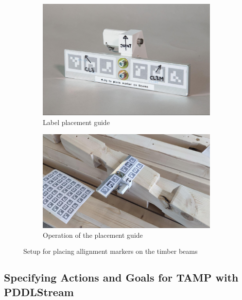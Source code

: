 \begin{figure}[!h]
    \centering
    \begin{subfigure}[b]{0.45\textwidth}
        \centering
        \includegraphics[width=\textwidth]{images/08/img20.jpg}
        \caption{Label placement guide}
        \label{fig:label-placement-guide}
    \end{subfigure}
    \hfill
    \begin{subfigure}[b]{0.53\textwidth}
        \centering
        \includegraphics[width=\textwidth]{images/08/img21.jpg}
        \caption{Operation of the placement guide}
        \label{fig:marker-placement-on-beam}
    \end{subfigure}
    \caption{Setup for placing allignment markers on the timber beams}
    \label{fig:setup-for-placing-allignment-markers}
\end{figure}

\subsection{Specifying Actions and Goals for TAMP with PDDLStream}
\label{subsection:exploration-5-specifying-actions-and-goals-for-tamp-with-pddlstream}


